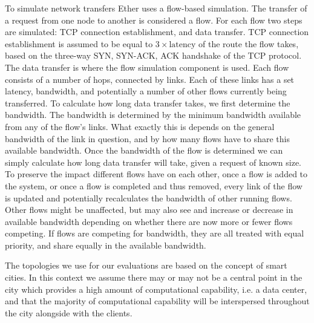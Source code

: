 \documentclass[draft,final]{vutinfth} %
\begin{document}
To simulate network transfers Ether uses a flow-based simulation.
The transfer of a request from one node to another is considered a flow.
For each flow two steps are simulated: TCP connection establishment, and data transfer.
TCP connection establishment is assumed to be equal to $ 3 \times \text{latency}$ of the route the flow takes, based on the three-way SYN, SYN-ACK, ACK handshake of the TCP protocol.\\
The data transfer is where the flow simulation component is used.
Each flow consists of a number of hops, connected by links.
Each of these links has a set latency, bandwidth, and potentially a number of other flows currently being transferred.
To calculate how long data transfer takes, we first determine the bandwidth.
The bandwidth is determined by the minimum bandwidth available from any of the flow's links.
What exactly this is depends on the general bandwidth of the link in question, and by how many flows have to share this available bandwidth.
Once the bandwidth of the flow is determined we can simply calculate how long data transfer will take, given a request of known size.
To preserve the impact different flows have on each other, once a flow is added to the system, or once a flow is completed and thus removed, every link of the flow is updated and potentially recalculates the bandwidth of other running flows.
Other flows might be unaffected, but may also see and increase or decrease in available bandwidth depending on whether there are now more or fewer flows competing.
If flows are competing for bandwidth, they are all treated with equal priority, and share equally in the available bandwidth.


The topologies we use for our evaluations are based on the concept of smart cities\cite{suSmartCityApplications2011}.
In this context we assume there may or may not be a central point in the city which provides a high amount of computational capability, i.e. a data center, and that the majority of computational capability will be interspersed throughout the city alongside with the clients.
\end{document}
